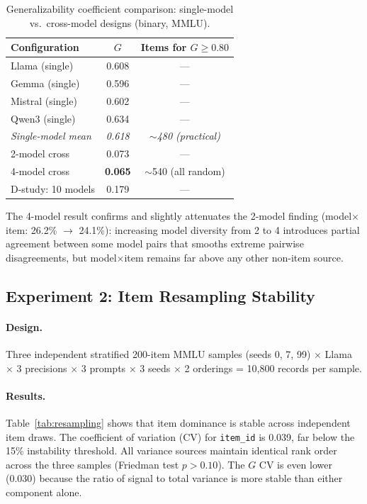 \documentclass[letterpaper]{article}
\newcommand{\gcoeff}{\ensuremath{G}}
\newcommand{\pct}{\%}
\begin{document}
\begin{table}[t]
\centering
\caption{Generalizability coefficient comparison: single-model vs.\ cross-model designs (binary, MMLU).}
\label{tab:g-coeff}
\small
\begin{tabular}{lcc}
\toprule
Configuration & $\gcoeff{}$ & Items for $\gcoeff{}\geq 0.80$ \\
\midrule
Llama (single) & 0.608 & --- \\
Gemma (single) & 0.596 & --- \\
Mistral (single) & 0.602 & --- \\
Qwen3 (single) & 0.634 & --- \\
\textit{Single-model mean} & \textit{0.618} & \textit{$\sim$480 (practical)} \\
\midrule
2-model cross & 0.073 & --- \\
4-model cross & \textbf{0.065} & $\sim$540 (all random) \\
D-study: 10 models & 0.179 & --- \\
\bottomrule
\end{tabular}
\end{table}

The 4-model result confirms and slightly attenuates the 2-model finding (model$\times$item: 26.2\pct{} $\to$ 24.1\pct{}): increasing model diversity from 2 to 4 introduces partial agreement between some model pairs that smooths extreme pairwise disagreements, but model$\times$item remains far above any other non-item source.

\subsection{Experiment 2: Item Resampling Stability}

\paragraph{Design.}
Three independent stratified 200-item MMLU samples (seeds 0, 7, 99) $\times$ Llama $\times$ 3 precisions $\times$ 3 prompts $\times$ 3 seeds $\times$ 2 orderings = 10,800 records per sample.

\paragraph{Results.}
Table~\ref{tab:resampling} shows that item dominance is stable across independent item draws.
The coefficient of variation (CV) for \texttt{item\_id} is 0.039, far below the 15\pct{} instability threshold.
All variance sources maintain identical rank order across the three samples (Friedman test $p > 0.10$).
The $\gcoeff{}$ CV is even lower (0.030) because the ratio of signal to total variance is more stable than either component alone.
\end{document}
